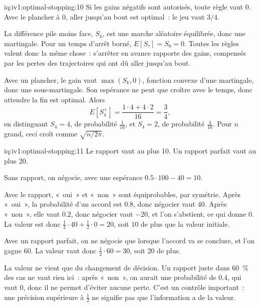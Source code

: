 \begin{solution}{iq:iv1:optimal-stopping:10}
Si les gains négatifs sont autorisés, toute règle vaut 0. Avec le plancher à 0, aller jusqu'au bout est optimal~: le jeu vaut $3/4$.

La différence pile moins face, $S_k$, est une marche aléatoire équilibrée, donc une martingale. Pour un temps d'arrêt borné, $E[S_\tau] = S_0 = 0$. Toutes les règles valent donc la même chose~: s'arrêter en avance rapporte des gains, compensés par les pertes des trajectoires qui ont dû aller jusqu'au bout.

Avec un plancher, le gain vaut $\max(S_k, 0)$, fonction convexe d'une martingale, donc une sous-martingale. Son espérance ne peut que croître avec le temps, donc attendre la fin est optimal. Alors
\[
E[S_4^+] = \frac{1 \cdot 4 + 4 \cdot 2}{16} = \frac34,
\]
en distinguant $S_4 = 4$, de probabilité $\tfrac{1}{16}$, et $S_4 = 2$, de probabilité $\tfrac{4}{16}$. Pour $n$ grand, ceci croît comme $\sqrt{n/2\pi}$.

\end{solution}

\begin{solution}{iq:iv1:optimal-stopping:11}
Le rapport vaut au plus 10. Un rapport parfait vaut au plus 20.

Sans rapport, on négocie, avec une espérance $0.5 \cdot 100 - 40 = 10$.

Avec le rapport, «~oui~» et «~non~» sont équiprobables, par symétrie. Après «~oui~», la probabilité d'un accord est $0.8$, donc négocier vaut $40$. Après «~non~», elle vaut $0.2$, donc négocier vaut $-20$, et l'on s'abstient, ce qui donne 0. La valeur est donc $\tfrac12 \cdot 40 + \tfrac12 \cdot 0 = 20$, soit 10 de plus que la valeur initiale.

Avec un rapport parfait, on ne négocie que lorsque l'accord va se conclure, et l'on gagne 60. La valeur vaut donc $\tfrac12 \cdot 60 = 30$, soit 20 de plus.

La valeur ne vient que du changement de décision. Un rapport juste dans 60~\% des cas ne vaut rien ici~: après «~non~», on aurait une probabilité de $0.4$, qui vaut 0, donc il ne permet d'éviter aucune perte. C'est un contrôle important~: une précision supérieure à $\tfrac12$ ne signifie pas que l'information a de la valeur.

\end{solution}


